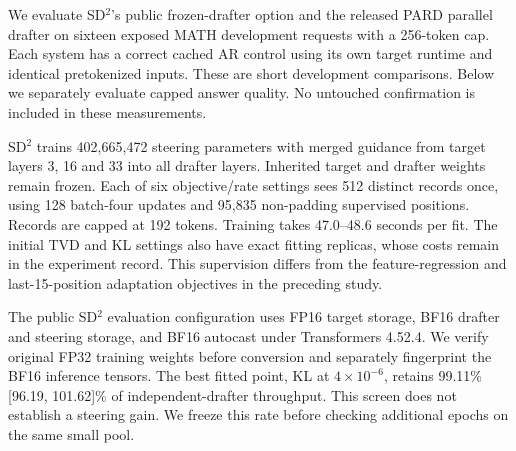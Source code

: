 \documentclass{article}
\begin{document}
We evaluate SD$^2$'s public frozen-drafter option and the released PARD
parallel drafter on sixteen exposed MATH development requests with a
256-token cap. Each system has a correct cached AR control using its
own target runtime and identical pretokenized inputs. These are short
development comparisons. Below we separately evaluate capped answer
quality. No untouched confirmation is included in these measurements.

SD$^2$ trains 402,665,472 steering parameters with merged guidance from
target layers 3, 16 and 33 into all drafter layers. Inherited target and
drafter weights remain frozen. Each of six objective/rate settings sees
512 distinct records once, using 128 batch-four updates and 95,835
non-padding supervised positions. Records are capped at 192 tokens.
Training takes 47.0--48.6 seconds per fit. The initial TVD and KL settings
also have exact fitting replicas, whose costs remain in the experiment
record. This supervision differs from the feature-regression and
last-15-position adaptation objectives in the preceding study.

\begin{table}[H]
\caption{One-epoch SD$^2$ development comparison. Intervals resample
paired requests 10,000 times and do not adjust for rate selection.
Exact AR counts identical capped token sequences.}
\label{tab:sd-square-development}
\centering\footnotesize
\setlength{\tabcolsep}{3pt}

\end{table}

The public SD$^2$ evaluation configuration uses FP16 target storage,
BF16 drafter and steering storage, and BF16 autocast under
Transformers 4.52.4. We verify original FP32 training weights before
conversion and separately fingerprint the BF16 inference tensors.
The best fitted point, KL at $4\times10^{-6}$, retains 99.11\%
[96.19, 101.62]\% of independent-drafter throughput. This screen does
not establish a steering gain. We freeze this rate before checking
additional epochs on the same small pool.

\begin{table}[H]
\caption{Released PARD with zero new-target fitting, Transformers
4.51.3, BF16 weights, eager attention and static caches. The released
checkpoint carries inherited proposer training.}
\label{tab:pard-development}
\centering\footnotesize

\end{table}
\end{document}
